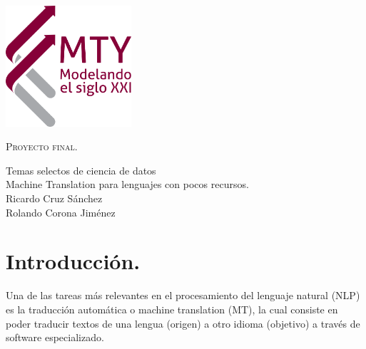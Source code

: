 \documentclass[12pt, letterpaper]{article}
\begin{document}
\begin{minipage}[c][0.6\textheight][t]{0.2\textwidth}
\begin{center}
\hskip2pt
\vrule width2.5pt height10cm
        \hskip1mm
        \vrule width1pt height10cm \\ \vspace{2cm}
        \includegraphics[height=4.5cm]{mty}
        \end{center}
\end{minipage}
\begin{minipage}[c][0.9\textheight][t]{0.65\textwidth}
  \begin{center}

	
    \vspace{3.2cm}
    

  \scshape Proyecto final.\\ \normalsize
  
  \vspace{2cm}  
  
    
            
    Temas selectos de ciencia de datos\\
    \vspace{1cm}   
    Machine Translation para lenguajes con pocos recursos.\\
    \vspace{1cm}   
    \vspace{1cm}   
    Ricardo Cruz Sánchez\\
    Rolando Corona Jiménez
    \vspace{.5cm}   
  \end{center}
  
\end{minipage}

\pagebreak
\tableofcontents

\cleardoublepage
\pagebreak
\section{Introducción.}
Una de las tareas más relevantes en el procesamiento del lenguaje natural (NLP) es la traducción automática o machine translation (MT), la cual consiste en poder traducir textos de una lengua (origen) a otro idioma (objetivo) a través de software especializado.\\
\end{document}
